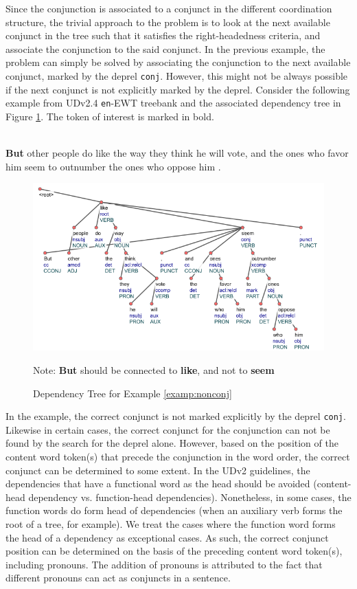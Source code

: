 Since the conjunction is associated to a conjunct in the different coordination structure, the trivial approach to the problem is to look at the next available conjunct in the tree such that it satisfies the right-headedness criteria, and associate the conjunction to the said conjunct. In the previous example, the problem can simply be solved by associating the conjunction to the next available conjunct, marked by the deprel \verb|conj|. However, this might not be always possible if the next conjunct is not explicitly marked by the deprel. Consider the following example from UDv2.4 \verb|en|-EWT treebank and the associated dependency tree in Figure \ref{fig:nonconj}. The token of interest is marked in bold.

\begin{example}
\label{examp:nonconj}
\textbf{}\\
\textbf{But} other people do like the way they think he will vote, and the ones who favor him seem to outnumber the ones who oppose him .
\end{example}

\begin{figure}[H]
    \centering
    \includegraphics[scale=0.75]{img/nonconj.png}
    \caption{Dependency Tree for Example \ref{examp:nonconj}}
    Note: \textbf{But} should be connected to \textbf{like}, and not to \textbf{seem}
    \label{fig:nonconj}
\end{figure}

In the example, the correct conjunct is not marked explicitly by the deprel \verb|conj|. Likewise in certain cases, the correct conjunct for the conjunction can not be found by the search for the deprel alone. However, based on the position of the content word token(s) that precede the conjunction in the word order, the correct conjunct can be determined to some extent. In the UDv2 guidelines, the dependencies that have a functional word as the head should be avoided (content-head dependency vs. function-head dependencies). Nonetheless, in some cases, the function words do form head of dependencies (when an auxiliary verb forms the root of a tree, for example). We treat the cases where the function word forms the head of a dependency as exceptional cases. As such, the correct conjunct position can be determined on the basis of the preceding content word token(s), including pronouns. The addition of pronouns is attributed to the fact that different pronouns can act as conjuncts in a sentence.

